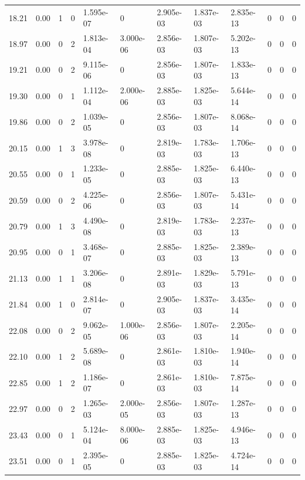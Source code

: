 \documentclass[preview]{standalone}
\begin{document}
{{{\begin{tabular}{L{1.2cm}C{1.2cm} C{0.3cm}C{0.5cm} C{1.4cm}C{1.4cm} C{1.4cm}C{1.4cm} C{1.6cm}C{1.6cm} C{1.6cm}C{1.6cm}}
  18.21  &  0.00  & 1     &  0 &  1.595e-07  & 0  &  2.905e-03&   1.837e-03& 2.835e-13 & 0   &  0 & 0  \\ 
  18.97  &  0.00  & 0     &  2 &  1.813e-04  & 3.000e-06  &  2.856e-03&   1.807e-03& 5.202e-13 & 0   &  0 & 0  \\ 
  19.21  &  0.00  & 0     &  2 &  9.115e-06  & 0  &  2.856e-03&   1.807e-03& 1.833e-13 & 0   &  0 & 0  \\ 
  19.30  &  0.00  & 0     &  1 &  1.112e-04  & 2.000e-06  &  2.885e-03&   1.825e-03& 5.644e-14 & 0   &  0 & 0  \\ 
  19.86  &  0.00  & 0     &  2 &  1.039e-05  & 0  &  2.856e-03&   1.807e-03& 8.068e-14 & 0   &  0 & 0  \\ 
  20.15  &  0.00  & 1     &  3 &  3.978e-08  & 0  &  2.819e-03&   1.783e-03& 1.706e-13 & 0   &  0 & 0  \\ 
  20.55  &  0.00  & 0     &  1 &  1.233e-05  & 0  &  2.885e-03&   1.825e-03& 6.440e-13 & 0   &  0 & 0  \\ 
  20.59  &  0.00  & 0     &  2 &  4.225e-06  & 0  &  2.856e-03&   1.807e-03& 5.431e-14 & 0   &  0 & 0  \\ 
  20.79  &  0.00  & 1     &  3 &  4.490e-08  & 0  &  2.819e-03&   1.783e-03& 2.237e-13 & 0   &  0 & 0  \\ 
  20.95  &  0.00  & 0     &  1 &  3.468e-07  & 0  &  2.885e-03&   1.825e-03& 2.389e-13 & 0   &  0 & 0  \\ 
  21.13  &  0.00  & 1     &  1 &  3.206e-08  & 0  &  2.891e-03&   1.829e-03& 5.791e-13 & 0   &  0 & 0  \\ 
  21.84  &  0.00  & 1     &  0 &  2.814e-07  & 0  &  2.905e-03&   1.837e-03& 3.435e-14 & 0   &  0 & 0  \\ 
  22.08  &  0.00  & 0     &  2 &  9.062e-05  & 1.000e-06  &  2.856e-03&   1.807e-03& 2.205e-14 & 0   &  0 & 0  \\ 
  22.10  &  0.00  & 1     &  2 &  5.689e-08  & 0  &  2.861e-03&   1.810e-03& 1.940e-14 & 0   &  0 & 0  \\ 
  22.85  &  0.00  & 1     &  2 &  1.186e-07  & 0  &  2.861e-03&   1.810e-03& 7.875e-14 & 0   &  0 & 0  \\ 
  22.97  &  0.00  & 0     &  2 &  1.265e-03  & 2.000e-05  &  2.856e-03&   1.807e-03& 1.287e-13 & 0   &  0 & 0  \\ 
  23.43  &  0.00  & 0     &  1 &  5.124e-04  & 8.000e-06  &  2.885e-03&   1.825e-03& 4.946e-13 & 0   &  0 & 0  \\ 
  23.51  &  0.00  & 0     &  1 &  2.395e-05  & 0  &  2.885e-03&   1.825e-03& 4.724e-14 & 0   &  0 & 0  \\ 

\end{tabular}}}}
\end{document}
